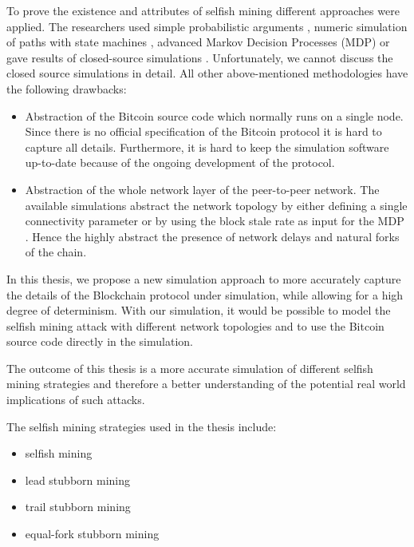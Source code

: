 To prove the existence and attributes of selfish mining different approaches were applied.
The researchers used simple probabilistic arguments \cite{eyal2014majority, bahack2013theoretical}, numeric simulation of paths with state machines \cite{gervais2015tampering, nayak2016stubborn}, advanced Markov Decision Processes (MDP) \cite{sapirshtein2016optimal, gervais2016security} or gave results of closed-source simulations \cite{eyal2014majority, sapirshtein2016optimal}.
Unfortunately, we cannot discuss the closed source simulations in detail.
All other above-mentioned methodologies have the following drawbacks:
\begin{itemize}
\item Abstraction of the Bitcoin source code which normally runs on a single node.
Since there is no official specification of the Bitcoin protocol it is hard to capture all details.
Furthermore, it is hard to keep the simulation software up-to-date because of the ongoing development of the protocol.
\item Abstraction of the whole network layer of the peer-to-peer network.
The available simulations abstract the network topology by either defining a single connectivity parameter \cite{eyal2014majority, bahack2013theoretical, nayak2016stubborn, sapirshtein2016optimal, gervais2015tampering} or by using the block stale rate as input for the MDP \cite{gervais2016security}.
Hence the highly abstract the presence of network delays and natural forks of the chain.
\end{itemize}

In this thesis, we propose a new simulation approach to more accurately capture the details of the Blockchain protocol under simulation, while allowing for a high degree of determinism.
With our simulation, it would be possible to model the selfish mining attack with different network topologies and to use the Bitcoin source code directly in the simulation.

The outcome of this thesis is a more accurate simulation of different selfish mining strategies and therefore a better understanding of the potential real world implications of such attacks.

The selfish mining strategies used in the thesis include:
\begin{itemize}
\item selfish mining \cite{eyal2014majority}
\item lead stubborn mining \cite{nayak2016stubborn}
\item trail stubborn mining \cite{nayak2016stubborn}
\item equal-fork stubborn mining \cite{nayak2016stubborn}
\end{itemize}

